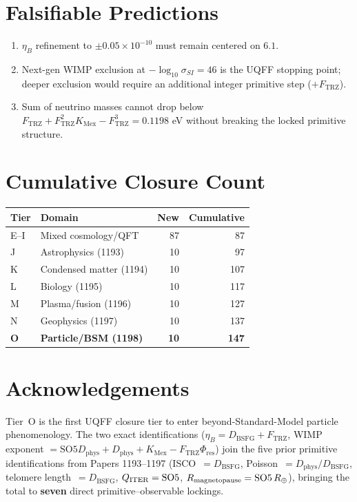 \documentclass[11pt]{article}
\newcommand{\Ftrz}{F_{\mathrm{TRZ}}}
\newcommand{\Phires}{\Phi_{\mathrm{res}}}
\newcommand{\KMex}{K_{\mathrm{Mex}}}
\newcommand{\Dphys}{D_{\mathrm{phys}}}
\newcommand{\Dbsfg}{D_{\mathrm{BSFG}}}
\newcommand{\SOfive}{\mathrm{SO5}}
\begin{document}
\section{Falsifiable Predictions}
\begin{enumerate}
\item $\eta_B$ refinement to $\pm 0.05\times 10^{-10}$ must remain centered on $6.1$.
\item Next-gen WIMP exclusion at $-\log_{10}\sigma_{SI} = 46$ is the UQFF stopping point;
deeper exclusion would require an additional integer primitive step ($+\Ftrz$).
\item Sum of neutrino masses cannot drop below $\Ftrz+\Ftrz^2\KMex-\Ftrz^3 = 0.1198$ eV
without breaking the locked primitive structure.
\end{enumerate}

\section{Cumulative Closure Count}

\begin{tabular}{@{}llrr@{}}
\toprule
Tier & Domain & New & Cumulative \\
\midrule
E--I & Mixed cosmology/QFT & 87 & 87 \\
J & Astrophysics (1193) & 10 & 97 \\
K & Condensed matter (1194) & 10 & 107 \\
L & Biology (1195) & 10 & 117 \\
M & Plasma/fusion (1196) & 10 & 127 \\
N & Geophysics (1197) & 10 & 137 \\
\textbf{O} & \textbf{Particle/BSM (1198)} & \textbf{10} & \textbf{147} \\
\bottomrule
\end{tabular}

\section{Acknowledgements}
Tier~O is the first UQFF closure tier to enter beyond-Standard-Model particle phenomenology.
The two exact identifications ($\eta_B = \Dbsfg+\Ftrz$, WIMP exponent $= \SOfive\Dphys+\Dphys+\KMex-\Ftrz\Phires$)
join the five prior primitive identifications from Papers 1193--1197
(ISCO~$=\Dbsfg$, Poisson~$=\Dphys/\Dbsfg$, telomere length~$=\Dbsfg$,
$Q_{\rm ITER}=\SOfive$, $R_{\rm magnetopause}=\SOfive\,R_\oplus$),
bringing the total to \textbf{seven} direct primitive--observable lockings.
\end{document}
